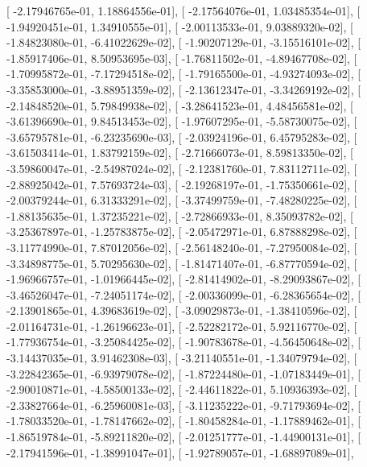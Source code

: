 \documentclass{article}
\begin{document}
       [ -2.17946765e-01,   1.18864556e-01],
       [ -2.17564076e-01,   1.03485354e-01],
       [ -1.94920451e-01,   1.34910555e-01],
       [ -2.00113533e-01,   9.03889320e-02],
       [ -1.84823080e-01,  -6.41022629e-02],
       [ -1.90207129e-01,  -3.15516101e-02],
       [ -1.85917406e-01,   8.50953695e-03],
       [ -1.76811502e-01,  -4.89467708e-02],
       [ -1.70995872e-01,  -7.17294518e-02],
       [ -1.79165500e-01,  -4.93274093e-02],
       [ -3.35853000e-01,  -3.88951359e-02],
       [ -2.13612347e-01,  -3.34269192e-02],
       [ -2.14848520e-01,   5.79849938e-02],
       [ -3.28641523e-01,   4.48456581e-02],
       [ -3.61396690e-01,   9.84513453e-02],
       [ -1.97607295e-01,  -5.58730075e-02],
       [ -3.65795781e-01,  -6.23235690e-03],
       [ -2.03924196e-01,   6.45795283e-02],
       [ -3.61503414e-01,   1.83792159e-02],
       [ -2.71666073e-01,   8.59813350e-02],
       [ -3.59860047e-01,  -2.54987024e-02],
       [ -2.12381760e-01,   7.83112711e-02],
       [ -2.88925042e-01,   7.57693724e-03],
       [ -2.19268197e-01,  -1.75350661e-02],
       [ -2.00379244e-01,   6.31333291e-02],
       [ -3.37499759e-01,  -7.48280225e-02],
       [ -1.88135635e-01,   1.37235221e-02],
       [ -2.72866933e-01,   8.35093782e-02],
       [ -3.25367897e-01,  -1.25783875e-02],
       [ -2.05472971e-01,   6.87888298e-02],
       [ -3.11774990e-01,   7.87012056e-02],
       [ -2.56148240e-01,  -7.27950084e-02],
       [ -3.34898775e-01,   5.70295630e-02],
       [ -1.81471407e-01,  -6.87770594e-02],
       [ -1.96966757e-01,  -1.01966445e-02],
       [ -2.81414902e-01,  -8.29093867e-02],
       [ -3.46526047e-01,  -7.24051174e-02],
       [ -2.00336099e-01,  -6.28365654e-02],
       [ -2.13901865e-01,   4.39683619e-02],
       [ -3.09029873e-01,  -1.38410596e-02],
       [ -2.01164731e-01,  -1.26196623e-01],
       [ -2.52282172e-01,   5.92116770e-02],
       [ -1.77936754e-01,  -3.25084425e-02],
       [ -1.90783678e-01,  -4.56450648e-02],
       [ -3.14437035e-01,   3.91462308e-03],
       [ -3.21140551e-01,  -1.34079794e-02],
       [ -3.22842365e-01,  -6.93979078e-02],
       [ -1.87224480e-01,  -1.07183449e-01],
       [ -2.90010871e-01,  -4.58500133e-02],
       [ -2.44611822e-01,   5.10936393e-02],
       [ -2.33827664e-01,  -6.25960081e-03],
       [ -3.11235222e-01,  -9.71793694e-02],
       [ -1.78033520e-01,  -1.78147662e-02],
       [ -1.80458284e-01,  -1.17889462e-01],
       [ -1.86519784e-01,  -5.89211820e-02],
       [ -2.01251777e-01,  -1.44900131e-01],
       [ -2.17941596e-01,  -1.38991047e-01],
       [ -1.92789057e-01,  -1.68897089e-01],
\end{document}
